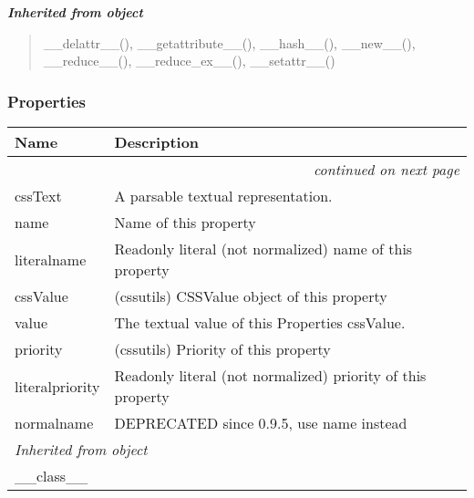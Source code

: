 \large{\textbf{\textit{Inherited from object}}}

\begin{quote}
\_\_delattr\_\_(), \_\_getattribute\_\_(), \_\_hash\_\_(), \_\_new\_\_(), \_\_reduce\_\_(), \_\_reduce\_ex\_\_(), \_\_setattr\_\_()
\end{quote}


  \subsubsection{Properties}

    \vspace{-1cm}
\hspace{\varindent}\begin{longtable}{|p{\varnamewidth}|p{\vardescrwidth}|l}
\cline{1-2}
\cline{1-2} \centering \textbf{Name} & \centering \textbf{Description}& \\
\cline{1-2}
\endhead\cline{1-2}\multicolumn{3}{r}{\small\textit{continued on next page}}\\\endfoot\cline{1-2}
\endlastfoot\raggedright c\-s\-s\-T\-e\-x\-t\- & \raggedright A parsable textual representation.&\\
\cline{1-2}
\raggedright n\-a\-m\-e\- & \raggedright Name of this property&\\
\cline{1-2}
\raggedright l\-i\-t\-e\-r\-a\-l\-n\-a\-m\-e\- & \raggedright Readonly literal (not normalized) name of this property&\\
\cline{1-2}
\raggedright c\-s\-s\-V\-a\-l\-u\-e\- & \raggedright (cssutils) CSSValue object of this property&\\
\cline{1-2}
\raggedright v\-a\-l\-u\-e\- & \raggedright The textual value of this Properties cssValue.&\\
\cline{1-2}
\raggedright p\-r\-i\-o\-r\-i\-t\-y\- & \raggedright (cssutils) Priority of this property&\\
\cline{1-2}
\raggedright l\-i\-t\-e\-r\-a\-l\-p\-r\-i\-o\-r\-i\-t\-y\- & \raggedright Readonly literal (not normalized) priority of this property&\\
\cline{1-2}
\raggedright n\-o\-r\-m\-a\-l\-n\-a\-m\-e\- & \raggedright DEPRECATED since 0.9.5, use name instead&\\
\cline{1-2}
\multicolumn{2}{|l|}{\textit{Inherited from object}}\\
\multicolumn{2}{|p{\varwidth}|}{\raggedright \_\_class\_\_}\\
\cline{1-2}
\end{longtable}

